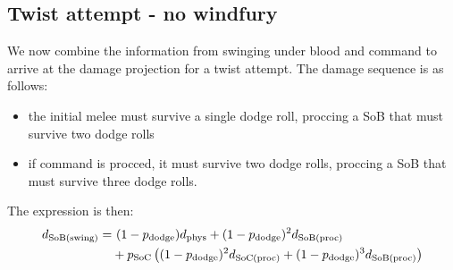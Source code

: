 \subsection{Twist attempt - no windfury}
We now combine the information from swinging under blood and command to arrive at the damage projection for a twist attempt.
The damage sequence is as follows:
\begin{itemize}
	\item the initial melee must survive a single dodge roll, proccing a SoB that must survive two dodge rolls
	\item if command is procced, it must survive two dodge rolls, proccing a SoB that must survive three dodge rolls.
\end{itemize}
The expression is then:
\begin{equation*}
	\begin{aligned}
		d_\mathrm{SoB(swing)}  =&~ (1 - p_{\mathrm{dodge}} ) d_{\mathrm{phys}}  + (1-p_{\mathrm{dodge}} )^2 d_\mathrm{SoB(proc)}  \\
		&+  p_\mathrm{SoC}    \left( (1-p_{\mathrm{dodge}} )^2d_\mathrm{SoC(proc)}  + (1-p_{\mathrm{dodge}} )^3 d_\mathrm{SoB(proc)}  \right)
	\end{aligned}
\end{equation*}

